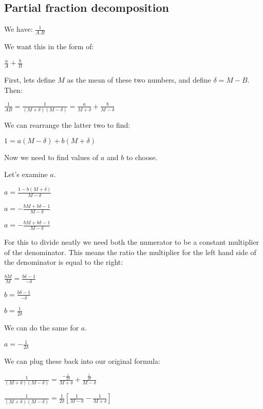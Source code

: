 \subsection{Partial fraction decomposition}

We have:
$\frac{1}{A.B}$

We want this in the form of:

$\frac{a}{A}+\frac{b}{B}$

First, lets define \(M\) as the mean of these two numbers, and define \(\delta=M-B\). Then:

$\frac{1}{AB}=\frac{1}{(M+\delta)(M-\delta)}=\frac{a}{M+\delta}+\frac{b}{M-\delta}$

We can rearrange the latter two to find:

$1=a(M-\delta)+b(M+\delta)$

Now we need to find values of \(a\) and \(b\) to choose.

Let's examine \(a\).

$a=\frac{1-b(M+\delta)}{M-\delta}$

$a=-\frac{bM+b\delta -1}{M-\delta}$

$a=-\frac{bM+b\delta -1}{M-\delta}$

For this to divide neatly we need both the numerator to be a constant multiplier of the denominator. This means the ratio the multiplier for the left hand side of the denominator is equal to the right:

$\frac{bM}{M}=\frac{b\delta -1}{-\delta}$

$b=\frac{b\delta -1}{-\delta}$

$b=\frac{1}{2\delta}$

We can do the same for \(a\).

$a=-\frac{1}{2\delta}$

We can plug these back into our original formula:

$\frac{1}{(M+\delta)(M-\delta)}=\frac{-\frac{1}{2\delta}}{M+\delta}+\frac{\frac{1}{2\delta}}{M-\delta}$

$\frac{1}{(M+\delta)(M-\delta)}=\frac{1}{2\delta}[\frac{1}{M-\delta}-\frac{1}{M+\delta}]$

